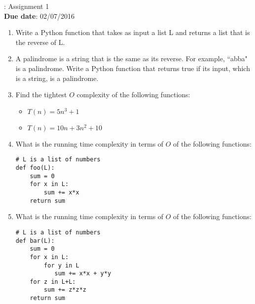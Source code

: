 \documentclass[11pt, oneside]{article}    %
\newcommand{\hw}[2]{\noindent {\bf COMP 4030/6030}: Assignment #1\\
{\bf Due date}: #2\\}
\begin{document}
\hw{1}{02/07/2016}
\begin{enumerate}
	\item 
Write a Python function that takes as input a list L and returns a list that is the reverse of L.

	\item
A palindrome is a string that is the same as its reverse.  For example, ``abba" is a palindrome.  Write a Python function that returns true if its input, which is a string, is a palindrome.

	\item Find the tightest $O$ complexity of the following functions:
	\begin{itemize}
		\item $T(n) = 5n^3 + 1$
		\item $T(n) = 10n + 3n^2 + 10$
	\end{itemize}

	\item
What is the running time complexity in terms of $O$ of the following functions:

\begin{verbatim}
# L is a list of numbers
def foo(L):
    sum = 0
    for x in L:
        sum += x*x
    return sum
\end{verbatim}

	\item
What is the running time complexity in terms of $O$ of the following functions:

\begin{verbatim}
# L is a list of numbers
def bar(L):
    sum = 0
    for x in L:
        for y in L
           sum += x*x + y*y
    for z in L+L:
        sum += z*z*z
    return sum
\end{verbatim}

\end{enumerate}
\end{document}
